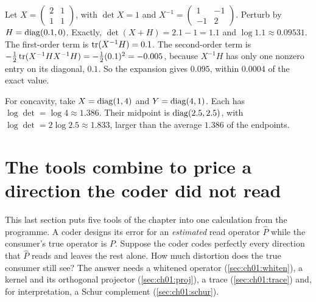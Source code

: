 \begin{example}\label{ex:ch01:logdet}
Let $X=\begin{pmatrix}2&1\\1&1\end{pmatrix}$, with $\det X=1$ and
$X^{-1}=\begin{pmatrix}1&-1\\-1&2\end{pmatrix}$. Perturb by $H=\operatorname{diag}(0.1,0)$.
Exactly, $\det(X+H)=2.1-1=1.1$ and $\log1.1\approx0.09531$. The first-order term
is $\operatorname{tr}(X^{-1}H)=0.1$. The second-order term is
$-\tfrac12\operatorname{tr}(X^{-1}HX^{-1}H)=-\tfrac12(0.1)^2=-0.005$, because
$X^{-1}H$ has only one nonzero entry on its diagonal, $0.1$. So the
expansion gives $0.095$, within $0.0004$ of the exact value.

For concavity, take $X=\operatorname{diag}(1,4)$ and $Y=\operatorname{diag}(4,1)$. Each has
$\log\det=\log4\approx1.386$. Their midpoint is $\operatorname{diag}(2.5,2.5)$, with
$\log\det=2\log2.5\approx1.833$, larger than the average $1.386$ of the
endpoints.
\end{example}



\section{The tools combine to price a direction the coder did not read}\label{sec:ch01:together}

This last section puts five tools of the chapter into one calculation from
the programme. A coder designs its error for an \emph{estimated} read
operator $\hat P$ while the consumer's true operator is $P$. Suppose the coder
codes perfectly every direction that $\hat P$ reads and leaves the rest alone.
How much distortion does the true consumer still see? The answer needs a
whitened operator (\cref{sec:ch01:whiten}), a kernel and its orthogonal
projector (\cref{sec:ch01:proj}), a trace (\cref{sec:ch01:trace}) and, for
interpretation, a Schur complement (\cref{sec:ch01:schur}).

